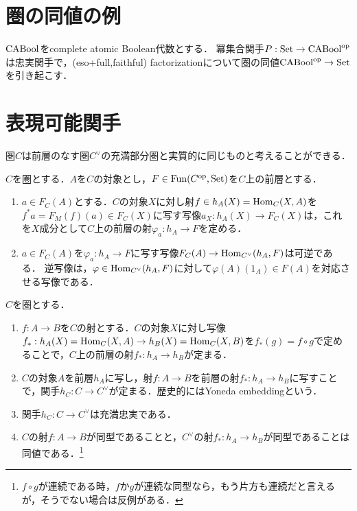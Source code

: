 \documentclass[uplatex,dvipdfmx]{jsreport}
\begin{document}
\section{圏の同値の例}

\begin{proposition}
    $\mathrm{CABool}$をcomplete atomic Boolean代数とする．
    冪集合関手$P:\mathrm{Set}\to\mathrm{CABool}^{\mathrm{op}}$は忠実関手で，(eso+full,faithful) factorizationについて圏の同値$\mathrm{CABool}^{\mathrm{op}}\to\mathrm{Set}$を引き起こす．
\end{proposition}

\section{表現可能関手}

\begin{tcolorbox}[colframe=ForestGreen, colback=ForestGreen!10!white,breakable,colbacktitle=ForestGreen!40!white,coltitle=black,fonttitle=\bfseries\sffamily,
title=]
    圏$C$は前層のなす圏$C^\vee$の充満部分圏と実質的に同じものと考えることができる．
\end{tcolorbox}

\begin{proposition}[米田の補題]
    $C$を圏とする．$A$を$C$の対象とし，$F\in\mathrm{Fun}(C^{\mathrm{op}},\mathrm{Set})$を$C$上の前層とする．
    \begin{enumerate}
        \item $a\in F_C(A)$とする．$C$の対象$X$に対し射$f\in h_A(X)=\mathrm{Hom}_C(X,A)$を$f^*a=F_M(f)(a)\in F_C(X)$に写す写像$a_X:h_A(X)\to F_C(X)$は，これを$X$成分として$C$上の前層の射$\varphi_a:h_A\to F$を定める．
        \item $a\in F_C(A)$を$\varphi_a:h_A\to F$に写す写像$F_C(A)\to\mathrm{Hom}_{C^\vee}(h_A,F)$は可逆である．
        逆写像は，$\varphi\in\mathrm{Hom}_{C^\vee}(h_A,F)$に対して$\varphi(A)(1_A)\in F(A)$を対応させる写像である．
    \end{enumerate}
\end{proposition}

\begin{corollary}
    $C$を圏とする．
    \begin{enumerate}
        \item $f:A\to B$を$C$の射とする．$C$の対象$X$に対し写像$f_*:h_A(X)=\mathrm{Hom}_C(X,A)\to h_B(X)=\mathrm{Hom}_C(X,B)$を$f_*(g)=f\circ g$で定めることで，$C$上の前層の射$f_*:h_A\to h_B$が定まる．
        \item $C$の対象$A$を前層$h_A$に写し，射$f:A\to B$を前層の射$f_*:h_A\to h_B$に写すことで，関手$h_C:C\to C^\vee$が定まる．歴史的にはYoneda embeddingという．
        \item 関手$h_C:C\to C^\vee$は充満忠実である．
        \item $C$の射$f:A\to B$が同型であることと，$C^\vee$の射$f_*:h_A\to h_B$が同型であることは同値である．\footnote{$f\circ g$が連続である時，$f$か$g$が連続な同型なら，もう片方も連続だと言えるが，そうでない場合は反例がある．}
    \end{enumerate}
\end{corollary}
\end{document}
